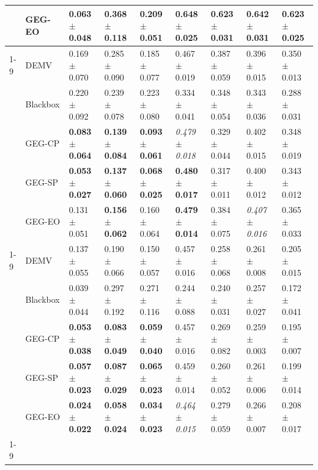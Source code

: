 \begin{table}
\begin{tabular}{lllllllll}
 & GEG-EO & 0.063 $\pm$ 0.048 & \textbf{0.368 $\pm$ 0.118} & \textbf{0.209 $\pm$ 0.051} & 0.648 $\pm$ 0.025 & 0.623 $\pm$ 0.031 & 0.642 $\pm$ 0.031 & 0.623 $\pm$ 0.025 \\
\cline{1-9}
\multirow[t]{5}{*}{park} & DEMV & 0.169 $\pm$ 0.070 & 0.285 $\pm$ 0.090 & 0.185 $\pm$ 0.077 & 0.467 $\pm$ 0.019 & 0.387 $\pm$ 0.059 & 0.396 $\pm$ 0.015 & 0.350 $\pm$ 0.013 \\
 & Blackbox & 0.220 $\pm$ 0.092 & 0.239 $\pm$ 0.078 & 0.223 $\pm$ 0.080 & 0.334 $\pm$ 0.041 & 0.348 $\pm$ 0.054 & 0.343 $\pm$ 0.036 & 0.288 $\pm$ 0.031 \\
 & GEG-CP & \textbf{0.083 $\pm$ 0.064} & \textbf{0.139 $\pm$ 0.084} & \textbf{0.093 $\pm$ 0.061} & \textit{0.479 $\pm$ 0.018} & 0.329 $\pm$ 0.044 & 0.402 $\pm$ 0.015 & 0.348 $\pm$ 0.019 \\
 & GEG-SP & \textbf{0.053 $\pm$ 0.027} & \textbf{0.137 $\pm$ 0.060} & \textbf{0.068 $\pm$ 0.025} & \textbf{0.480 $\pm$ 0.017} & 0.317 $\pm$ 0.011 & 0.400 $\pm$ 0.012 & 0.343 $\pm$ 0.012 \\
 & GEG-EO & 0.131 $\pm$ 0.051 & \textbf{0.156 $\pm$ 0.062} & 0.160 $\pm$ 0.064 & \textbf{0.479 $\pm$ 0.014} & 0.384 $\pm$ 0.075 & \textit{0.407 $\pm$ 0.016} & 0.365 $\pm$ 0.033 \\
\cline{1-9}
\multirow[t]{5}{*}{wine} & DEMV & 0.137 $\pm$ 0.055 & 0.190 $\pm$ 0.066 & 0.150 $\pm$ 0.057 & 0.457 $\pm$ 0.016 & 0.258 $\pm$ 0.068 & 0.261 $\pm$ 0.008 & 0.205 $\pm$ 0.015 \\
 & Blackbox & 0.039 $\pm$ 0.044 & 0.297 $\pm$ 0.192 & 0.271 $\pm$ 0.116 & 0.244 $\pm$ 0.088 & 0.240 $\pm$ 0.031 & 0.257 $\pm$ 0.027 & 0.172 $\pm$ 0.041 \\
 & GEG-CP & \textbf{0.053 $\pm$ 0.038} & \textbf{0.083 $\pm$ 0.049} & \textbf{0.059 $\pm$ 0.040} & 0.457 $\pm$ 0.016 & 0.269 $\pm$ 0.082 & 0.259 $\pm$ 0.003 & 0.195 $\pm$ 0.007 \\
 & GEG-SP & \textbf{0.057 $\pm$ 0.023} & \textbf{0.087 $\pm$ 0.029} & \textbf{0.065 $\pm$ 0.023} & 0.459 $\pm$ 0.014 & 0.260 $\pm$ 0.052 & 0.261 $\pm$ 0.006 & 0.199 $\pm$ 0.014 \\
 & GEG-EO & \textbf{0.024 $\pm$ 0.022} & \textbf{0.058 $\pm$ 0.024} & \textbf{0.034 $\pm$ 0.023} & \textit{0.464 $\pm$ 0.015} & 0.279 $\pm$ 0.059 & 0.266 $\pm$ 0.007 & 0.208 $\pm$ 0.017 \\
\cline{1-9}
\bottomrule
\end{tabular}
\end{table}
